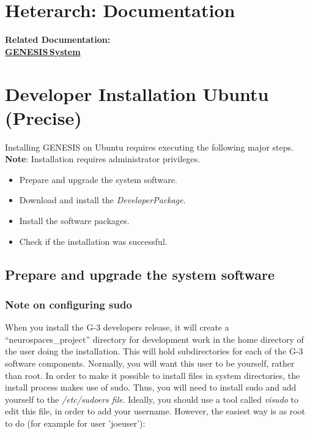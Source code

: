 \documentclass[12pt]{article}
\begin{document}
\section*{Heterarch: Documentation}

{\bf Related Documentation:} \\
\href{../genesis-system/genesis-system.tex}{\bf GENESIS\,System}

\section*{Developer Installation Ubuntu (Precise)}

Installing GENESIS on Ubuntu requires executing the following major steps. {\bf Note}: Installation requires administrator privileges.
\begin{itemize}
   \item[] Prepare and upgrade the system software.
   \item[] Download and install the {\it DeveloperPackage}.
   \item[] Install the software packages.
   \item[] Check if the installation was successful. 
\end{itemize}

\subsection*{Prepare and upgrade the system software}

\subsubsection*{Note on configuring sudo}

When you install the G-3 developers release, it will create a
``neurospaces\_project'' directory for development work in the home
directory of the user doing the installation.  This will hold
subdirectories for each of the G-3 software components.  Normally, you
will want this user to be yourself, rather than root.  In order to
make it possible to install files in system directories, the install
process makes use of sudo.  Thus, you will need to install sudo and
add yourself to the {\it /etc/sudoers file}.  Ideally, you should use
a tool called {\it visudo} to edit this file, in order to add your
username.  However, the easiest way is as root to do (for example for
user 'joeuser'):
\end{document}
